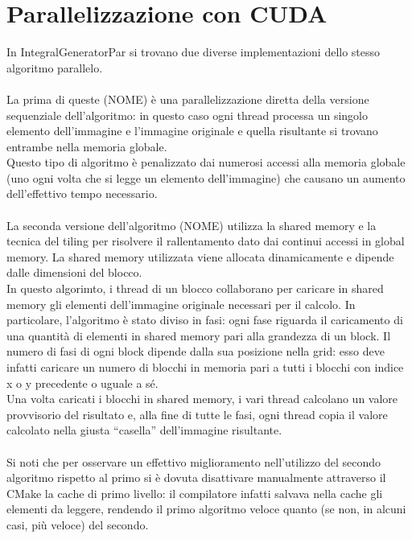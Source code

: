 \documentclass[10pt,twocolumn,letterpaper]{article}
\begin{document}
\section{Parallelizzazione con CUDA}
In IntegralGeneratorPar si trovano due diverse implementazioni dello stesso algoritmo parallelo.\\
\\
La prima di queste (NOME) è una parallelizzazione diretta della versione sequenziale dell’algoritmo: in questo caso ogni thread processa un singolo elemento dell’immagine e l’immagine originale e quella risultante si trovano entrambe nella memoria globale.\\
Questo tipo di algoritmo è penalizzato dai numerosi accessi alla memoria globale (uno ogni volta che si legge un elemento dell’immagine) che causano un aumento dell’effettivo tempo necessario.\\
\\
La seconda versione dell’algoritmo (NOME) utilizza la shared memory e la tecnica del tiling per risolvere il rallentamento dato dai continui accessi in global memory. La shared memory utilizzata viene allocata dinamicamente e dipende dalle dimensioni del blocco.\\
In questo algorimto, i thread di un blocco collaborano per caricare in shared memory gli elementi dell’immagine originale necessari per il calcolo. In particolare, l’algoritmo è stato diviso in fasi: ogni fase riguarda il caricamento di una quantità di elementi in shared memory pari alla grandezza di un block. Il numero di fasi di ogni block dipende dalla sua posizione nella grid: esso deve infatti caricare un numero di blocchi in memoria pari a tutti i blocchi con indice x o y precedente o uguale a sé.\\
Una volta caricati i blocchi in shared memory, i vari thread calcolano un valore provvisorio del risultato e, alla fine di tutte le fasi, ogni thread copia il valore calcolato nella giusta “casella” dell’immagine risultante.\\
\\
Si noti che per osservare un effettivo miglioramento nell’utilizzo del secondo algoritmo rispetto al primo si è dovuta disattivare manualmente attraverso il CMake la cache di primo livello: il compilatore infatti salvava nella cache gli elementi da leggere, rendendo il primo algoritmo veloce quanto (se non, in alcuni casi, più veloce) del secondo.
\end{document}
